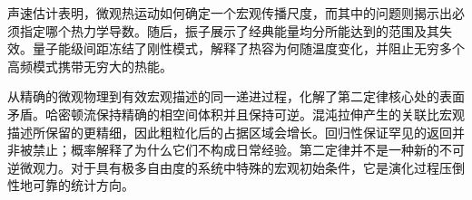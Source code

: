 声速估计表明，微观热运动如何确定一个宏观传播尺度，而其中的问题则揭示出必须指定哪个热力学导数。随后，振子展示了经典能量均分所能达到的范围及其失效。量子能级间距冻结了刚性模式，解释了热容为何随温度变化，并阻止无穷多个高频模式携带无穷大的热能。

从精确的微观物理到有效宏观描述的同一递进过程，化解了第二定律核心处的表面矛盾。哈密顿流保持精确的相空间体积并且保持可逆。混沌拉伸产生的关联比宏观描述所保留的更精细，因此粗粒化后的占据区域会增长。回归性保证罕见的返回并非被禁止；概率解释了为什么它们不构成日常经验。第二定律并不是一种新的不可逆微观力。对于具有极多自由度的系统中特殊的宏观初始条件，它是演化过程压倒性地可靠的统计方向。